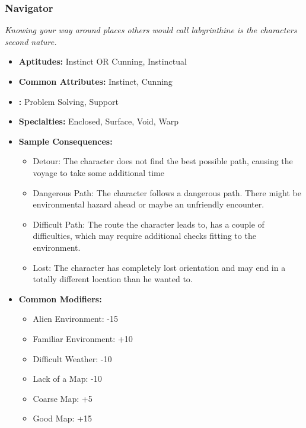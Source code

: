 	\subsubsection{Navigator}\label{Navigator}
		\textit{Knowing your way around places others would call labyrinthine is the characters second nature.}
		\begin{itemize}
			\item \textbf{Aptitudes:} Instinct OR Cunning, Instinctual
			\item \textbf{Common Attributes:} Instinct, Cunning
			\item \textbf{:} Problem Solving, Support
			\item \textbf{Specialties:} Enclosed, Surface, Void, Warp
			\item \textbf{Sample Consequences:} 
			\begin{itemize}
				\item Detour: The character does not find the best possible path, causing the voyage to take some additional time
				\item Dangerous Path: The character follows a dangerous path. There might be environmental hazard ahead or maybe an unfriendly encounter.
				\item Difficult Path: The route the character leads to, has a couple of difficulties, which may require additional checks fitting to the environment.
				\item Lost: The character has completely lost orientation and may end in a totally different location than he wanted to. 
			\end{itemize}
			\item \textbf{Common Modifiers:}
			\begin{itemize}
		 		\item Alien Environment: -15
		 		\item Familiar Environment: +10
		 		\item Difficult Weather: -10
		 		\item Lack of a Map: -10
		 		\item Coarse Map: +5
		 		\item Good Map: +15
			\end{itemize}
		\end{itemize}

